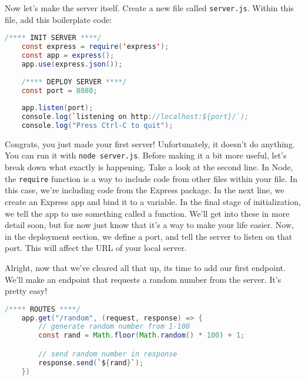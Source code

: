 Now let's make the server itself. Create a new file called \texttt{server.js}. Within this file, add this boilerplate code:

\begin{lstlisting}[language=Java]
    /**** INIT SERVER ****/
    const express = require('express');
    const app = express();
    app.use(express.json());
    
    /**** DEPLOY SERVER ****/
    const port = 8080;
    
    app.listen(port);
    console.log(`listening on http://localhost:${port}/`);
    console.log("Press Ctrl-C to quit");
\end{lstlisting}

Congrats, you just made your first server! Unfortunately, it doesn't do anything. You can run it with \texttt{node server.js}. Before making it a bit more useful, let's break down what exactly is happening. Take a look at the second line. In Node, the \texttt{require} function is a way to include code from other files within your file. In this case, we're including code from the Express package. In the next line, we create an Express app and bind it to a variable. In the final stage of initialization, we tell the app to use something called a  function. We'll get into these in more detail soon, but for now just know that it's a way to make your life easier. Now, in the deployment section, we define a port, and tell the server to listen on that port. This will affect the URL of your local server.

Alright, now that we've cleared all that up, its time to add our first endpoint. We'll make an endpoint that requests a random number from the server. It's pretty easy!

\begin{lstlisting}[language=Java,firstnumber=6]
    /**** ROUTES ****/
    app.get("/random", (request, response) => {
        // generate random number from 1-100
        const rand = Math.floor(Math.random() * 100) + 1;

        // send random number in response
        response.send(`${rand}`);
    })
\end{lstlisting}

